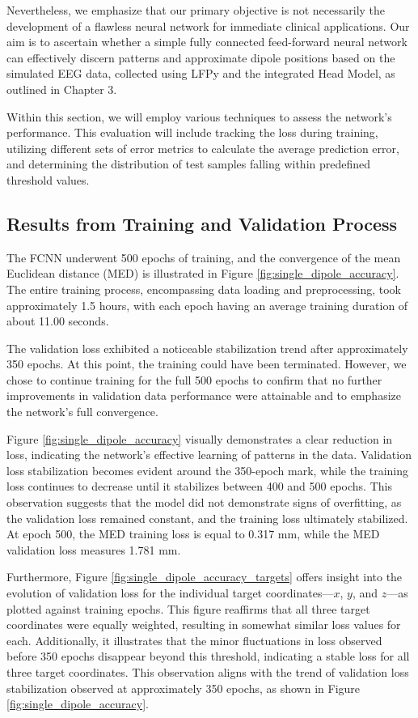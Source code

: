 \documentclass[a4paper, UKenglish, 11pt]{uiomaster}
\begin{document}
Nevertheless, we emphasize that our primary objective is not necessarily the development of a flawless neural network for immediate clinical applications. Our aim is to ascertain whether a simple fully connected feed-forward neural network can effectively discern patterns and approximate dipole positions based on the simulated EEG data, collected using LFPy and the integrated Head Model, as outlined in Chapter 3.

Within this section, we will employ various techniques to assess the network's performance. This evaluation will include tracking the loss during training, utilizing different sets of error metrics to calculate the average prediction error, and determining the distribution of test samples falling within predefined threshold values.

\subsection{Results from Training and Validation Process}
The FCNN underwent 500 epochs of training, and the convergence of the mean Euclidean distance (MED) is illustrated in Figure \ref{fig:single_dipole_accuracy}. The entire training process, encompassing data loading and preprocessing, took approximately 1.5 hours, with each epoch having an average training duration of about 11.00 seconds.

The validation loss exhibited a noticeable stabilization trend after approximately 350 epochs. At this point, the training could have been terminated. However, we chose to continue training for the full 500 epochs to confirm that no further improvements in validation data performance were attainable and to emphasize the network's full convergence.

Figure \ref{fig:single_dipole_accuracy} visually demonstrates a clear reduction in loss, indicating the network's effective learning of patterns in the data. Validation loss stabilization becomes evident around the 350-epoch mark, while the training loss continues to decrease until it stabilizes between 400 and 500 epochs. This observation suggests that the model did not demonstrate signs of overfitting, as the validation loss remained constant, and the training loss ultimately stabilized. At epoch 500, the MED training loss is equal to 0.317 mm, while the MED validation loss measures 1.781 mm.

Furthermore, Figure \ref{fig:single_dipole_accuracy_targets} offers insight into the evolution of validation loss for the individual target coordinates—$x$, $y$, and $z$—as plotted against training epochs. This figure reaffirms that all three target coordinates were equally weighted, resulting in somewhat similar loss values for each. Additionally, it illustrates that the minor fluctuations in loss observed before 350 epochs disappear beyond this threshold, indicating a stable loss for all three target coordinates. This observation aligns with the trend of validation loss stabilization observed at approximately 350 epochs, as shown in Figure \ref{fig:single_dipole_accuracy}.
\end{document}
